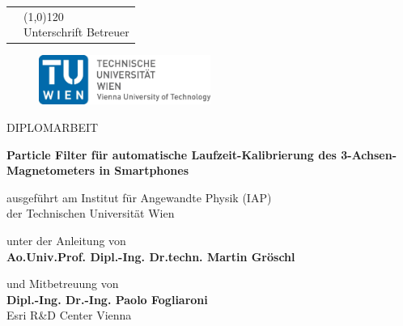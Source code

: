 \begin{titlepage}


\begin{tabular}{ >{\centering}p{9cm} >{\centering}p{7cm} }
	\space & {\line(1,0){120}\\Unterschrift Betreuer}
\end{tabular}

\begin{center}

\begin{figure}[h]
	\centering
	\includegraphics[width=0.5\textwidth]{figures/TU_Wien_Logo.pdf}
\end{figure}

\begin{LARGE}

\par\noindent
DIPLOMARBEIT


\textbf{Particle Filter für automatische Laufzeit-Kalibrierung des 3-Achsen-Magnetometers in Smartphones} \\

\end{LARGE}

\begin{large}
ausgeführt am Institut für Angewandte Physik (IAP) \\
der Technischen Universität Wien


unter der Anleitung von \\
\textbf{Ao.Univ.Prof. Dipl.-Ing. Dr.techn. Martin Gröschl}


und Mitbetreuung von \\
\textbf{Dipl.-Ing. Dr.-Ing. Paolo Fogliaroni} \\
Esri R\&D Center Vienna


\end{large}
\end{center}
\end{titlepage}
